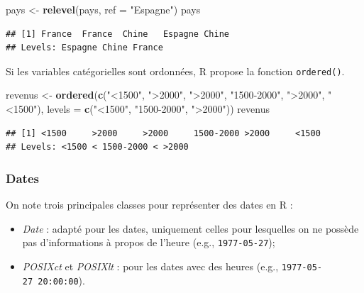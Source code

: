 \documentclass[
  11pt,
]{book}
\newenvironment{Shaded}{\begin{snugshade}}{\end{snugshade}}
\newcommand{\DataTypeTok}[1]{\textcolor[rgb]{0.13,0.29,0.53}{#1}}
\newcommand{\KeywordTok}[1]{\textcolor[rgb]{0.13,0.29,0.53}{\textbf{#1}}}
\newcommand{\NormalTok}[1]{#1}
\newcommand{\StringTok}[1]{\textcolor[rgb]{0.31,0.60,0.02}{#1}}
\providecommand{\tightlist}{%
  \setlength{\itemsep}{0pt}\setlength{\parskip}{0pt}}
\numberwithin{equation}{section}
\numberwithin{countremarque}{section}
\begin{document}
\begin{Shaded}
\begin{Highlighting}[]
\NormalTok{pays \textless{}{-}}\StringTok{ }\KeywordTok{relevel}\NormalTok{(pays, }\DataTypeTok{ref =} \StringTok{"Espagne"}\NormalTok{)}
\NormalTok{pays}
\end{Highlighting}
\end{Shaded}

\begin{lstlisting}
## [1] France  France  Chine   Espagne Chine  
## Levels: Espagne Chine France
\end{lstlisting}

Si les variables catégorielles sont ordonnées, R propose la fonction \texttt{ordered()}.

\begin{Shaded}
\begin{Highlighting}[]
\NormalTok{revenus \textless{}{-}}\StringTok{ }
\StringTok{  }\KeywordTok{ordered}\NormalTok{(}\KeywordTok{c}\NormalTok{(}\StringTok{"\textless{}1500"}\NormalTok{, }\StringTok{"\textgreater{}2000"}\NormalTok{, }\StringTok{"\textgreater{}2000"}\NormalTok{, }\StringTok{"1500{-}2000"}\NormalTok{, }\StringTok{"\textgreater{}2000"}\NormalTok{, }\StringTok{"\textless{}1500"}\NormalTok{),}
          \DataTypeTok{levels =} \KeywordTok{c}\NormalTok{(}\StringTok{"\textless{}1500"}\NormalTok{, }\StringTok{"1500{-}2000"}\NormalTok{, }\StringTok{"\textgreater{}2000"}\NormalTok{))}
\NormalTok{revenus}
\end{Highlighting}
\end{Shaded}

\begin{lstlisting}
## [1] <1500     >2000     >2000     1500-2000 >2000     <1500    
## Levels: <1500 < 1500-2000 < >2000
\end{lstlisting}

\hypertarget{structure-dates}{%
\subsubsection{Dates}\label{structure-dates}}

On note trois principales classes pour représenter des dates en R :

\begin{itemize}
\tightlist
\item
  \emph{Date} : adapté pour les dates, uniquement celles pour lesquelles on ne possède pas d'informations à propos de l'heure (e.g., \texttt{1977-05-27});
\item
  \emph{POSIXct} et \emph{POSIXlt} : pour les dates avec des heures (e.g., \texttt{1977-05-27\ 20:00:00}).
\end{itemize}
\end{document}

